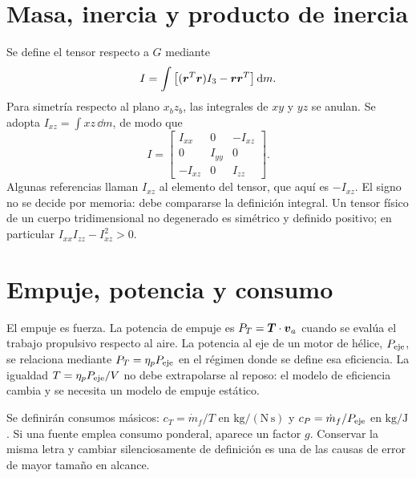 \section{Masa, inercia y producto de inercia}
Se define el tensor respecto a $G$ mediante
\begin{equation}
I=\int\big[(\boldsymbol{r}^T\boldsymbol{r})I_3-\boldsymbol{r}\boldsymbol{r}^T\big]\,\mathrm{d} m.
\end{equation}
Para simetría respecto al plano $x_bz_b$, las integrales de $xy$ y $yz$ se anulan. Se adopta $I_{xz}=\int xz\,\dd m$, de modo que
\begin{equation}
I=\begin{bmatrix}I_{xx}&0&-I_{xz}\\0&I_{yy}&0\\-I_{xz}&0&I_{zz}\end{bmatrix}.
\end{equation}
Algunas referencias llaman $I_{xz}$ al elemento del tensor, que aquí es $-I_{xz}$. El signo no se decide por memoria: debe compararse la definición integral. Un tensor físico de un cuerpo tridimensional no degenerado es simétrico y definido positivo; en particular $I_{xx}I_{zz}-I_{xz}^2>0$.

\section{Empuje, potencia y consumo}
El empuje es fuerza. La potencia de empuje es $P_T=\boldsymbol{T}\cdot\boldsymbol{v}_a$ cuando se evalúa el trabajo propulsivo respecto al aire. La potencia al eje de un motor de hélice, $P_{\rm eje}$, se relaciona mediante $P_T=\eta_pP_{\rm eje}$ en el régimen donde se define esa eficiencia. La igualdad $T=\eta_pP_{\rm eje}/V$ no debe extrapolarse al reposo: el modelo de eficiencia cambia y se necesita un modelo de empuje estático.

Se definirán consumos másicos: $c_T=\dot m_f/T$ en $\mathrm{kg/(N\,s)}$ y $c_P=\dot m_f/P_{\rm eje}$ en $\mathrm{kg/J}$. Si una fuente emplea consumo ponderal, aparece un factor $g$. Conservar la misma letra y cambiar silenciosamente de definición es una de las causas de error de mayor tamaño en alcance.



